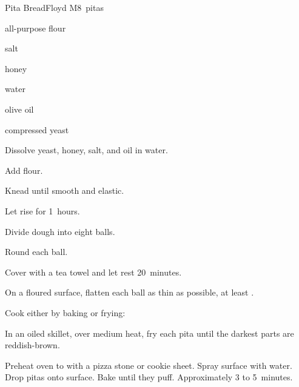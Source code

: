\begin{recipe}{Pita Bread}{Floyd M}{8~pitas}

\begin{ingredients}
\item {} all-purpose flour
\item {} salt
\item {} honey
\item {} water
\item {} olive oil
\item {} compressed yeast
\end{ingredients}

\begin{directions}
\item Dissolve yeast, honey, salt, and oil in water.
\item Add flour.
\item Knead until smooth and elastic.
\item Let rise for 1\half{}~hours.
\item Divide dough into eight balls.
\item Round each ball.
\item Cover with a tea towel and let rest 20~minutes.
\item On a floured surface, flatten each ball as thin as possible, at least \inch{\quarter}.
\item Cook either by baking or frying:
\begin{itemize*}
\item In an oiled skillet, over medium heat, fry each pita until the darkest parts are reddish-brown.
\item Preheat oven to  with a pizza stone or cookie sheet. Spray surface with water. Drop pitas onto surface. Bake until they puff. Approximately 3 to 5~minutes.
\end{itemize*}
\end{directions}

\end{recipe}
